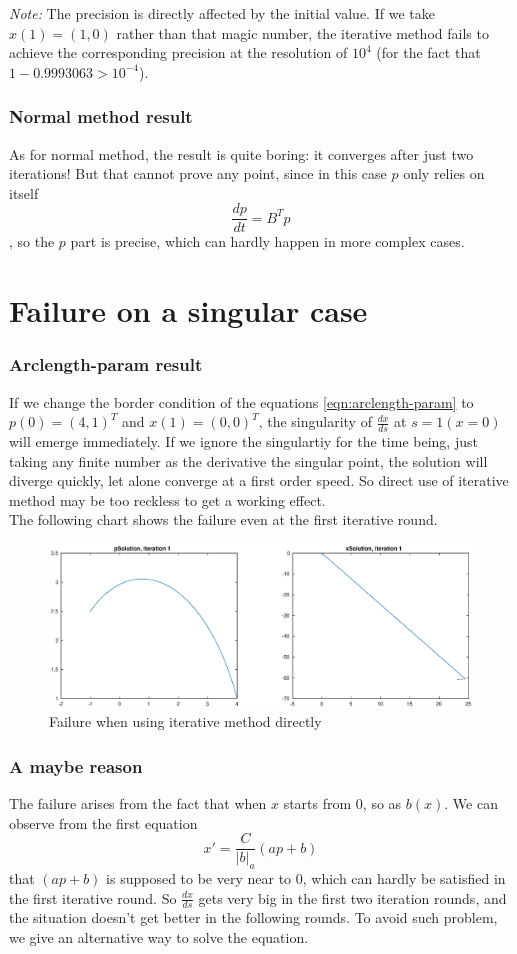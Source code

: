 \documentclass[a4paper]{article}
\begin{document}
\emph{Note:} The precision is directly affected by the initial value.
If we take $x(1) = (1, 0)$ rather than that magic number, the iterative method fails to achieve the corresponding precision at the resolution of $10^4$ (for the fact that $1 - 0.9993063 > 10^{-4}$).
\section{Normal method result}
As for normal method, the result is quite boring: it converges after just two iterations!
But that cannot prove any point, since in this case $p$ only relies on itself
$$\frac{dp}{dt} = B^T p$$,
so the $p$ part is precise, which can hardly happen in more complex cases.

\part{Failure on a singular case}
\section{Arclength-param result}
If we change the border condition of the equations \eqref{eqn:arclength-param} to $p(0) = (4, 1)^T$ and $x(1) = (0, 0)^T$, the singularity of $\frac{dx}{ds}$ at $s=1 (x=0)$ will emerge immediately.
If we ignore the singulartiy for the time being, just taking any finite number as the derivative the singular point, the solution will diverge quickly, let alone converge at a first order speed.
So direct use of iterative method may be too reckless to get a working effect.
\\
The following chart shows the failure even at the first iterative round.
\begin{figure}[h]
	\centering
	\includegraphics[width=\textwidth]{part2-failure}
	\caption{Failure when using iterative method directly}
	\label{fig:p2-failure}
\end{figure}
\section{A maybe reason}
The failure arises from the fact that when $x$ starts from $0$, so as $b(x)$.
We can observe from the first equation
$$ x' = \frac{C}{|b|_a}(ap+b) $$
that $(ap+b)$ is supposed to be very near to $0$, which can hardly be satisfied in the first iterative round.
So $\frac{dx}{ds}$ gets very big in the first two iteration rounds, and the situation doesn't get better in the following rounds.
To avoid such problem, we give an alternative way to solve the equation.
\end{document}
